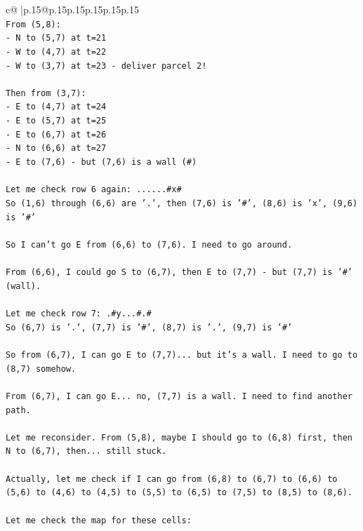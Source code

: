 \documentclass{article}
\begin{document}
{\begin{supertabular}{c@{$\;$}|p{.15\linewidth}@{}p{.15\linewidth}p{.15\linewidth}p{.15\linewidth}p{.15\linewidth}p{.15\linewidth}}
{{{\\ 
\texttt{From (5,8):} \\
\texttt{{-} N to (5,7) at t=21} \\
\texttt{{-} W to (4,7) at t=22} \\
\texttt{{-} W to (3,7) at t=23 {-} deliver parcel 2!} \\
\\ 
\texttt{Then from (3,7):} \\
\texttt{{-} E to (4,7) at t=24} \\
\texttt{{-} E to (5,7) at t=25} \\
\texttt{{-} E to (6,7) at t=26} \\
\texttt{{-} N to (6,6) at t=27} \\
\texttt{{-} E to (7,6) {-} but (7,6) is a wall (\#)} \\
\\ 
\texttt{Let me check row 6 again: ......\#x\#} \\
\texttt{So (1,6) through (6,6) are '.', then (7,6) is '\#', (8,6) is 'x', (9,6) is '\#'} \\
\\ 
\texttt{So I can't go E from (6,6) to (7,6). I need to go around.} \\
\\ 
\texttt{From (6,6), I could go S to (6,7), then E to (7,7) {-} but (7,7) is '\#' (wall).} \\
\\ 
\texttt{Let me check row 7: .\#y...\#.\#} \\
\texttt{So (6,7) is '.', (7,7) is '\#', (8,7) is '.', (9,7) is '\#'} \\
\\ 
\texttt{So from (6,7), I can go E to (7,7)... but it's a wall. I need to go to (8,7) somehow.} \\
\\ 
\texttt{From (6,7), I can go E... no, (7,7) is a wall. I need to find another path.} \\
\\ 
\texttt{Let me reconsider. From (5,8), maybe I should go to (6,8) first, then N to (6,7), then... still stuck.} \\
\\ 
\texttt{Actually, let me check if I can go from (6,8) to (6,7) to (6,6) to (5,6) to (4,6) to (4,5) to (5,5) to (6,5) to (7,5) to (8,5) to (8,6).} \\
\\ 
\texttt{Let me check the map for these cells:} \\
}}}
\end{supertabular}}
\end{document}

